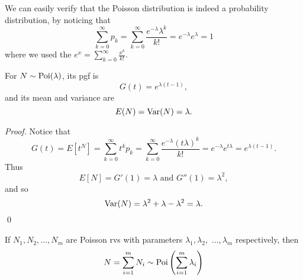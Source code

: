 \documentclass[notoc,notitlepage]{tufte-book}
\begin{document}
\begin{remark}
  We can easily verify that the Poisson distribution is indeed a probability distribution, by noticing that
  \begin{equation*}
    \sum_{k=0}^{\infty} p_k = \sum_{k=0}^{\infty} \frac{e^{-\lambda} \lambda^k}{k!} = e^{-\lambda} e^{\lambda} = 1
  \end{equation*}
  where we used the  $e^{x} = \sum_{k=0}^{\infty} \frac{x^k}{k!}$.
\end{remark}

\begin{propo}\label{propo:pgf_mean_and_variance_of_poisson_distribution}
  For $N \sim \operatorname{Poi}(\lambda)$, its pgf is
  \begin{equation*}
    G(t) = e^{\lambda (t - 1)},
  \end{equation*}
  and its mean and variance are
  \begin{equation*}
    E(N) = \operatorname{Var}(N) = \lambda.
  \end{equation*}
\end{propo}

\begin{proof}
  Notice that
  \begin{equation*}
    G(t) = E\left[ t^N \right] = \sum_{k=0}^{\infty} t^k p_k = \sum_{k=0}^{\infty} \frac{e^{-\lambda} (t \lambda)^k}{k!} = e^{-\lambda} e^{t \lambda} = e^{\lambda( t - 1 )}.
  \end{equation*}
  Thus
  \begin{equation*}
    E[N] = G'(1) = \lambda \text{ and } G''(1) = \lambda^2,
  \end{equation*}
  and so
  \begin{equation*}
    \operatorname{Var}(N) = \lambda^2 + \lambda - \lambda^2 = \lambda.
  \end{equation*}\qed\
\end{proof}

\begin{propo}\label{propo:sum_of_independent_poisson_rvs}
  If $N_1, N_2, \ldots, N_m$ are \hlnotea{independent} Poisson rvs with parameters $\lambda_1, \lambda_2,$ $\ldots, \lambda_m$ respectively, then
  \begin{equation*}
    N = \sum_{i=1}^{m} N_i \sim \operatorname{Poi} \left( \sum_{i=1}^{m} \lambda_i \right)
  \end{equation*}
\end{propo}
\end{document}

